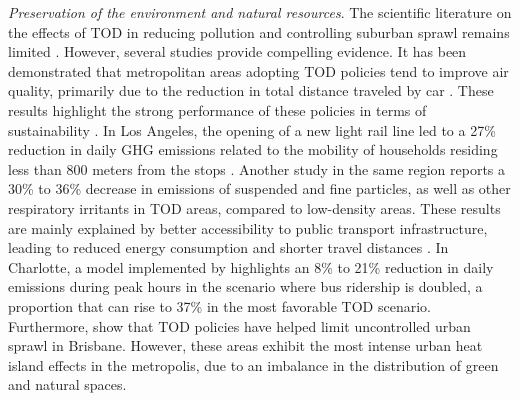 \begin{refsegment}
\textsl{Preservation of the environment and natural resources}. The scientific literature on the effects of \acrshort{TOD} in reducing pollution and controlling suburban sprawl remains limited \textcolor{blue}{\autocite[11]{ashik_investigating_2022}}. However, several studies provide compelling evidence. It has been demonstrated that metropolitan areas adopting \acrshort{TOD} policies tend to improve air quality, primarily due to the reduction in total distance traveled by car \textcolor{blue}{\autocite[20]{gu_transit-oriented_2019}}. These results highlight the strong performance of these policies in terms of sustainability \textcolor{blue}{\autocite[109]{choi_influence_2018}}. In Los Angeles, the opening of a new light rail line led to a 27\% reduction in daily \acrshort{GHG} emissions related to the mobility of households residing less than 800 meters from the stops \textcolor{blue}{\autocite[13]{boarnet_can_2017}}. Another study in the same region reports a 30\% to 36\% decrease in emissions of suspended and fine particles, as well as other respiratory irritants in \acrshort{TOD} areas, compared to low-density areas. These results are mainly explained by better accessibility to public transport infrastructure, leading to reduced energy consumption and shorter travel distances \textcolor{blue}{\autocite[25]{nahlik_transit-oriented_2014}}. In Charlotte, a model implemented by \textcolor{blue}{\textcite[4]{hosseini_understanding_2024}} highlights an 8\% to 21\% reduction in daily emissions during peak hours in the scenario where bus ridership is doubled, a proportion that can rise to 37\% in the most favorable \acrshort{TOD} scenario. Furthermore, \textcolor{blue}{\textcite[120]{kamruzzaman_investigating_2018}} show that \acrshort{TOD} policies have helped limit uncontrolled urban sprawl in Brisbane. However, these areas exhibit the most intense urban heat island effects in the metropolis, due to an imbalance in the distribution of green and natural spaces.%


\end{refsegment}
